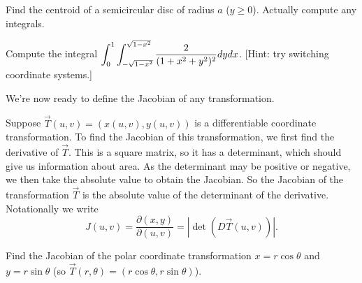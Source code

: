 \begin{problem}
Find the centroid of a semicircular disc of radius $a$ ($y\geq 0$). Actually compute any integrals.  
\end{problem}

\begin{problem}
Compute the integral $\displaystyle \int_{0}^{1}\int_{-\sqrt{1-x^2}}^{\sqrt{1-x^2}} \frac{2}{(1+x^2+y^2)^2}dydx$. [Hint: try switching coordinate systems.]
\end{problem}




We're now ready to define the Jacobian of any transformation.
\begin{definition}
 Suppose $\vec T(u,v)=(x(u,v),y(u,v))$ is a differentiable coordinate transformation. To find the Jacobian of this transformation, we first find the derivative of $\vec T$.  This is a square matrix, so it has a determinant, which should give us information about area. As the determinant may be positive or negative, we then take the absolute value to obtain the Jacobian.  So the Jacobian of the transformation $\vec T$ is the absolute value of the determinant of the derivative. 
 Notationally we write 
$$J(u,v) = \frac{\partial (x,y)}{\partial (u,v)} = |\det(D\vec T(u,v))|.$$
\end{definition}

\begin{problem}
 Find the Jacobian of the polar coordinate transformation $x=r\cos\theta$ and $y=r\sin\theta$ (so $\vec T(r,\theta)=(r\cos\theta,r\sin\theta)$).
\end{problem}

